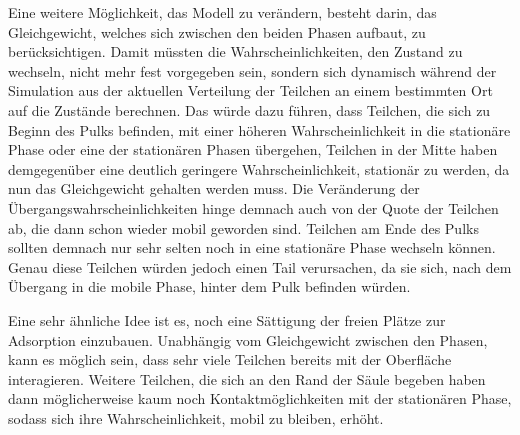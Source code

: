 Eine weitere Möglichkeit, das Modell zu verändern, besteht darin, das Gleichgewicht, welches sich zwischen den beiden Phasen aufbaut, zu berücksichtigen. Damit müssten die Wahrscheinlichkeiten, den Zustand zu wechseln, nicht mehr fest vorgegeben sein, sondern sich dynamisch während der Simulation aus der aktuellen Verteilung der Teilchen an einem bestimmten Ort auf die Zustände berechnen. Das würde dazu führen, dass Teilchen, die sich zu Beginn des Pulks befinden, mit einer höheren Wahrscheinlichkeit in die stationäre Phase oder eine der stationären Phasen übergehen, Teilchen in der Mitte haben demgegenüber eine deutlich geringere Wahrscheinlichkeit, stationär zu werden, da nun das Gleichgewicht gehalten werden muss. Die Veränderung der Übergangswahrscheinlichkeiten hinge demnach auch von der Quote der Teilchen ab, die dann schon wieder mobil geworden sind. Teilchen am Ende des Pulks sollten demnach nur sehr selten noch in eine stationäre Phase wechseln können. Genau diese Teilchen würden jedoch einen Tail verursachen, da sie sich, nach dem Übergang in die mobile Phase, hinter dem Pulk befinden würden.

Eine sehr ähnliche Idee ist es, noch eine Sättigung der freien Plätze zur Adsorption einzubauen. Unabhängig vom Gleichgewicht zwischen den Phasen, kann es möglich sein, dass sehr viele Teilchen bereits mit der Oberfläche interagieren. Weitere Teilchen, die sich an den Rand der Säule begeben haben dann möglicherweise kaum noch Kontaktmöglichkeiten mit der stationären Phase, sodass sich ihre Wahrscheinlichkeit, mobil zu bleiben, erhöht.

